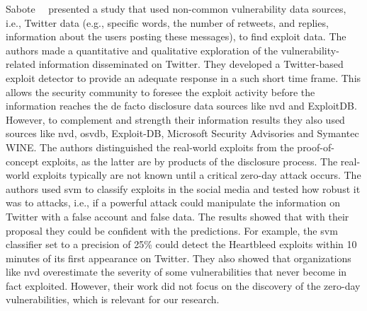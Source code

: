 Sabote~\etal{}~\cite{Sabottke:2015} presented a study that used non-common vulnerability data sources, i.e., Twitter data (e.g., specific words, the number of retweets, and replies, information about
the users posting these messages), to find exploit data. 
The authors made a quantitative and qualitative exploration of the vulnerability-related information disseminated on Twitter.
They developed a Twitter-based exploit detector to provide an adequate response in a such short time frame. 
This allows the security community to foresee the exploit activity before the information reaches the de facto disclosure data sources like \gls{nvd} and ExploitDB.
However, to complement and strength their information results they also used sources like \gls{nvd}, \gls{osvdb}, Exploit-DB, Microsoft Security Advisories and Symantec WINE. 
The authors distinguished the real-world exploits from the proof-of-concept exploits, as the latter are by products of the disclosure process. 
The real-world exploits typically are not known until a critical zero-day attack occurs. 
The authors used \gls{svm} to classify exploits in the social media and tested how robust it was to attacks, i.e., if a powerful attack could manipulate the information on Twitter with a false account and false data. 
The results showed that with their proposal they could be confident with the predictions. 
For example, the \gls{svm} classifier set to a precision of 25\% could detect the Heartbleed exploits within 10 minutes of its first appearance on Twitter. 
They also showed that organizations like \gls{nvd} overestimate the severity of some vulnerabilities that never become in fact exploited.
However, their work did not focus on the discovery of the zero-day vulnerabilities, which is relevant for our research.



